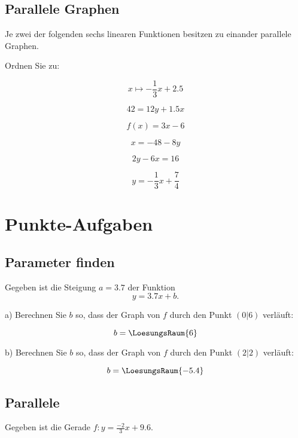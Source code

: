 \subsection{Parallele Graphen}
Je zwei der folgenden sechs linearen Funktionen besitzen zu einander parallele
Graphen.

Ordnen Sie zu:

$$x\mapsto -\frac13 x + 2.5$$

$$42 = 12y + 1.5x$$

$$f(x) = 3x-6$$

$$x=-48-8y$$

$$2y-6x = 16$$

$$y= - \frac13 x + \frac74$$
\section{Punkte-Aufgaben}

\subsection{Parameter finden}
Gegeben ist die Steigung $a=3.7$ der Funktion
$$y=3.7x + b.$$

a) Berechnen Sie $b$ so, dass der Graph von $f$ durch den Punkt $(0|6)$
verläuft:

$$b = \LoesungsRaum{6}$$



b) Berechnen Sie $b$ so, dass der Graph von $f$ durch den Punkt
$(2|2)$ verläuft:

$$b= \LoesungsRaum{-5.4}$$

\subsection{Parallele}
Gegeben ist die Gerade $f: y=\frac{-2}3x+9.6$.

